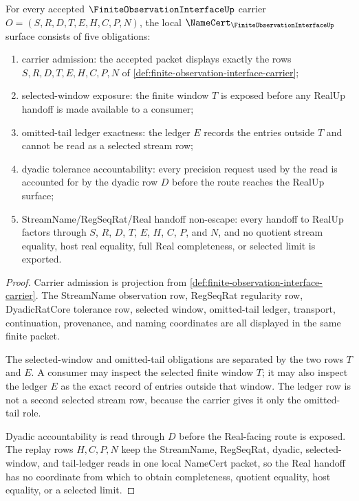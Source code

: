 \begin{theorem}
\label{thm:finite-observation-interface-namecert-obligations}
For every accepted $\FiniteObservationInterfaceUp$ carrier $O=(S,R,D,T,E,H,C,P,N)$, the local $\NameCert_{\FiniteObservationInterfaceUp}$ surface consists of five obligations:
\begin{enumerate}
\item carrier admission: the accepted packet displays exactly the rows $S,R,D,T,E,H,C,P,N$ of \autoref{def:finite-observation-interface-carrier};
\item selected-window exposure: the finite window $T$ is exposed before any RealUp handoff is made available to a consumer;
\item omitted-tail ledger exactness: the ledger $E$ records the entries outside $T$ and cannot be read as a selected stream row;
\item dyadic tolerance accountability: every precision request used by the read is accounted for by the dyadic row $D$ before the route reaches the RealUp surface;
\item StreamName/RegSeqRat/Real handoff non-escape: every handoff to RealUp factors through $S$, $R$, $D$, $T$, $E$, $H$, $C$, $P$, and $N$, and no quotient stream equality, host real equality, full Real completeness, or selected limit is exported.
\end{enumerate}
\end{theorem}
\begin{proof}
Carrier admission is projection from \autoref{def:finite-observation-interface-carrier}. The StreamName observation row, RegSeqRat regularity row, DyadicRatCore tolerance row, selected window, omitted-tail ledger, transport, continuation, provenance, and naming coordinates are all displayed in the same finite packet.

The selected-window and omitted-tail obligations are separated by the two rows $T$ and $E$. A consumer may inspect the selected finite window $T$; it may also inspect the ledger $E$ as the exact record of entries outside that window. The ledger row is not a second selected stream row, because the carrier gives it only the omitted-tail role.

Dyadic accountability is read through $D$ before the Real-facing route is exposed. The replay rows $H,C,P,N$ keep the StreamName, RegSeqRat, dyadic, selected-window, and tail-ledger reads in one local NameCert packet, so the Real handoff has no coordinate from which to obtain completeness, quotient equality, host equality, or a selected limit.
\end{proof}

